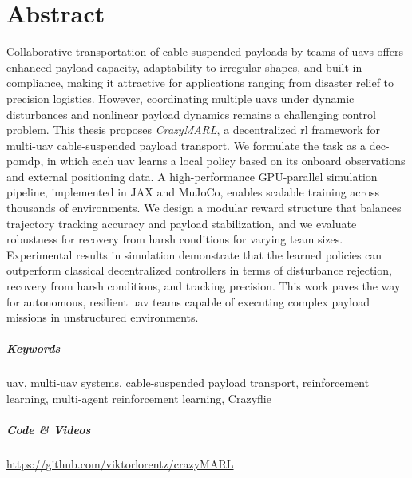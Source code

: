 \chapter*{Abstract}
\thispagestyle{empty}
Collaborative transportation of cable-suspended payloads by teams of \glspl{uav} offers enhanced payload capacity, adaptability to irregular shapes, and built-in compliance, making it attractive for applications ranging from disaster relief to precision logistics. However, coordinating multiple \glspl{uav} under dynamic disturbances and nonlinear payload dynamics remains a challenging control problem. This thesis proposes \textit{CrazyMARL}, a decentralized \gls{rl} framework for multi-\gls{uav} cable-suspended payload transport. We formulate the task as a \gls{dec-pomdp}, in which each \gls{uav} learns a local policy based on its onboard observations and external positioning data. A high-performance GPU-parallel simulation pipeline, implemented in JAX and MuJoCo, enables scalable training across thousands of environments. We design a modular reward structure that balances trajectory tracking accuracy and payload stabilization, and we evaluate robustness for recovery from harsh conditions for varying team sizes. Experimental results in simulation demonstrate that the learned policies can outperform classical decentralized controllers in terms of disturbance rejection, recovery from harsh conditions, and tracking precision. This work paves the way for autonomous, resilient \gls{uav} teams capable of executing complex payload missions in unstructured environments.
\paragraph{Keywords}
\gls{uav}, multi-\gls{uav} systems, cable-suspended payload transport, reinforcement learning, multi-agent reinforcement learning, Crazyflie




\paragraph{Code \& Videos}
\url{https://github.com/viktorlorentz/crazyMARL}


